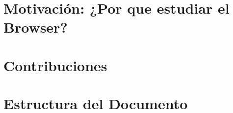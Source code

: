 \label{chap:intro}


\section{Motivación: ¿Por que estudiar el Browser?}
\label{chap:intro.1}


\section{Contribuciones}
\label{chap:intro.2}

\section{Estructura del Documento}
\label{chap:intro.3}

